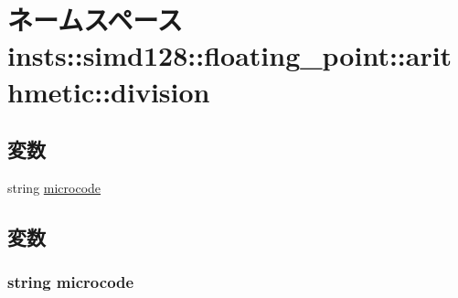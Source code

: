 \hypertarget{namespaceinsts_1_1simd128_1_1floating__point_1_1arithmetic_1_1division}{
\section{ネームスペース insts::simd128::floating\_\-point::arithmetic::division}
\label{namespaceinsts_1_1simd128_1_1floating__point_1_1arithmetic_1_1division}
}
\subsection*{変数}
\begin{DoxyCompactItemize}
\item 
string \hyperlink{namespaceinsts_1_1simd128_1_1floating__point_1_1arithmetic_1_1division_a770f11a173e99389a8802f0107ed8f52}{microcode}
\end{DoxyCompactItemize}


\subsection{変数}
\hypertarget{namespaceinsts_1_1simd128_1_1floating__point_1_1arithmetic_1_1division_a770f11a173e99389a8802f0107ed8f52}{
\subsubsection[{microcode}]{\setlength{\rightskip}{0pt plus 5cm}string {\bf microcode}}}
\label{namespaceinsts_1_1simd128_1_1floating__point_1_1arithmetic_1_1division_a770f11a173e99389a8802f0107ed8f52}
